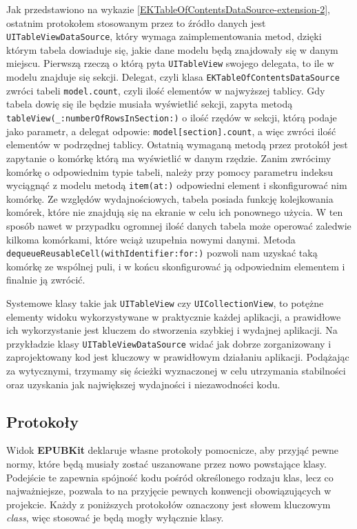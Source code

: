 Jak przedstawiono na wykazie \ref{EKTableOfContentsDataSource-extension-2}, ostatnim protokołem stosowanym przez to źródło danych jest \texttt{UITableViewDataSource}, który wymaga zaimplementowania metod, dzięki którym tabela dowiaduje się, jakie dane modelu będą znajdowały się w danym miejscu. Pierwszą rzeczą o którą pyta \texttt{UITableView} swojego delegata, to ile w modelu znajduje się sekcji. Delegat, czyli klasa \texttt{EKTableOfContentsDataSource} zwróci tabeli \texttt{model.count}, czyli ilość elementów w najwyższej tablicy. Gdy tabela dowię się ile będzie musiała wyświetlić sekcji, zapyta metodą \texttt{tableView(\_:numberOfRowsInSection:)} o ilość rzędów w sekcji, którą podaje jako parametr, a delegat odpowie: \texttt{model[section].count}, a więc zwróci ilość elementów w podrzędnej tablicy. Ostatnią wymaganą metodą przez protokół jest zapytanie o komórkę którą ma wyświetlić w danym rzędzie. Zanim zwrócimy komórkę o odpowiednim typie tabeli, należy przy pomocy parametru indeksu wyciągnąć z modelu metodą \texttt{item(at:)} odpowiedni element i skonfigurować nim komórkę. Ze względów wydajnościowych, tabela posiada funkcję kolejkowania komórek, które nie znajdują się na ekranie w celu ich ponownego użycia. W ten sposób nawet w przypadku ogromnej ilość danych tabela może operować zaledwie kilkoma komórkami, które wciąż uzupełnia nowymi danymi. Metoda \texttt{dequeueReusableCell(withIdentifier:for:)} pozwoli nam uzyskać taką komórkę ze wspólnej puli, i w końcu skonfigurować ją odpowiednim elementem i finalnie ją zwrócić.

Systemowe klasy takie jak \texttt{UITableView} czy \texttt{UICollectionView}, to potężne elementy widoku wykorzystywane w praktycznie każdej aplikacji, a prawidłowe ich wykorzystanie jest kluczem do stworzenia szybkiej i wydajnej aplikacji. Na przykładzie klasy \texttt{UITableViewDataSource} widać jak dobrze zorganizowany i zaprojektowany kod jest kluczowy w prawidłowym działaniu aplikacji. Podążając za wytycznymi, trzymamy się ścieżki wyznaczonej w celu utrzymania stabilności oraz uzyskania jak największej wydajności i niezawodności kodu.

\subsection{Protokoły}

Widok \textbf{EPUBKit} deklaruje własne protokoły pomocnicze, aby przyjąć pewne normy, które będą musiały zostać uszanowane przez nowo powstające klasy. Podejście te zapewnia spójność kodu pośród określonego rodzaju klas, lecz co najważniejsze, pozwala to na przyjęcie pewnych konwencji obowiązujących w projekcie\cite{AdvancedSwift}. Każdy z poniższych protokołów oznaczony jest słowem kluczowym \textit{class}, więc stosować je będą mogły wyłącznie klasy.

